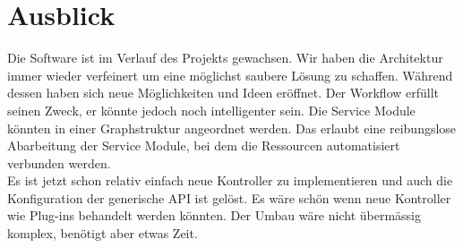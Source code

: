 \chapter{Ausblick}
Die Software ist im Verlauf des Projekts gewachsen. Wir haben die Architektur immer wieder verfeinert um eine möglichst saubere Lösung zu schaffen. Während dessen haben sich neue Möglichkeiten und Ideen eröffnet. Der Workflow erfüllt seinen Zweck, er könnte jedoch noch intelligenter sein. Die Service Module könnten in einer Graphstruktur angeordnet werden. Das erlaubt eine reibungslose Abarbeitung der Service Module, bei dem die Ressourcen automatisiert verbunden werden.\\
Es ist jetzt schon relativ einfach neue Kontroller zu implementieren und auch die Konfiguration der generische API ist gelöst. Es wäre schön wenn neue Kontroller wie Plug-ins behandelt werden könnten. Der Umbau wäre nicht übermässig komplex, benötigt aber etwas Zeit.\\